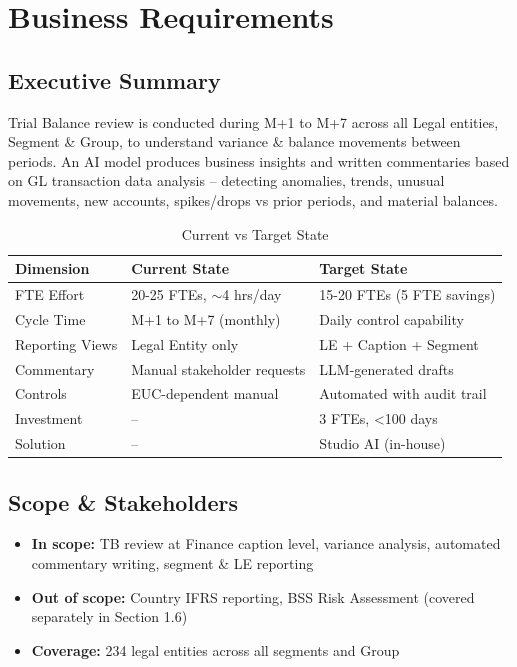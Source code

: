 \documentclass[11pt,a4paper]{article}
\begin{document}

\section{Business Requirements}

\subsection{Executive Summary}

Trial Balance review is conducted during M+1 to M+7 across all Legal entities, 
Segment \& Group, to understand variance \& balance movements between periods. 
An AI model produces business insights and written commentaries based on GL transaction 
data analysis -- detecting anomalies, trends, unusual movements, new accounts, spikes/drops 
vs prior periods, and material balances.

\begin{table}[h]
\centering
\caption{Current vs Target State}
\begin{tabular}{@{}L{3cm}L{5cm}L{5.5cm}@{}}
\toprule
\textbf{Dimension} & \textbf{Current State} & \textbf{Target State} \\
\midrule
FTE Effort & 20-25 FTEs, $\sim$4 hrs/day & 15-20 FTEs (5 FTE savings) \\
Cycle Time & M+1 to M+7 (monthly) & Daily control capability \\
Reporting Views & Legal Entity only & LE + Caption + Segment \\
Commentary & Manual stakeholder requests & LLM-generated drafts \\
Controls & EUC-dependent manual & Automated with audit trail \\
Investment & -- & 3 FTEs, <100 days \\
Solution & -- & Studio AI (in-house) \\
\bottomrule
\end{tabular}
\end{table}

\subsection{Scope \& Stakeholders}

\begin{itemize}[noitemsep]
    \item \textbf{In scope:} TB review at Finance caption level, variance analysis, automated commentary writing, segment \& LE reporting
    \item \textbf{Out of scope:} Country IFRS reporting, BSS Risk Assessment (covered separately in Section 1.6)
    \item \textbf{Coverage:} 234 legal entities across all segments and Group
\end{itemize}
\end{document}
